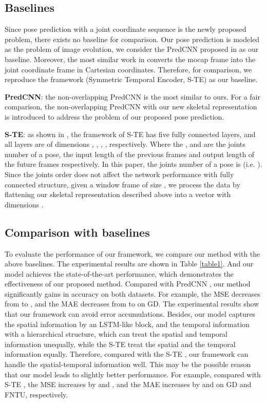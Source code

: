 \documentclass[journal]{IEEEtran}
\begin{document}
\subsection{Baselines}
Since pose prediction with a joint coordinate sequence is the newly proposed problem, there exists no baseline for comparison. Our pose prediction is modeled as the problem of image evolution, we consider the PredCNN proposed in \cite{predcnn} as our baseline. Moreover, the most similar work in \cite{ButepageDRL} converts the mocap frame into the joint coordinate frame in Cartesian coordinates. Therefore, for comparison, we reproduce the framework (Symmetric Temporal Encoder, S-TE) as our baseline.

{\bf PredCNN}: the non-overlapping PredCNN is the most similar to ours. For a fair comparison, the non-overlapping PredCNN with our new skeletal representation is introduced to address the problem of our proposed pose prediction.

{\bf S-TE}: as shown in \cite{ButepageDRL}, the framework of S-TE has five fully connected layers, and all layers are of dimensions  , , , ,  respectively. Where the ,  and  are the joints number of a pose, the input length of the previous frames and output length of the future frames respectively. In this paper, the joints number of a pose is  (i.e. ). Since the joints order does not affect the network performance with fully connected structure, given a window frame of size , we process the data by flattening our skeletal representation described above into a vector with dimensions .

\subsection{Comparison with baselines}
To evaluate the performance of our framework, we compare our method with the above baselines. The experimental results are shown in Table \ref{table1}. And our model achieves the state-of-the-art performance, which demonstrates the effectiveness of our proposed method. Compared with PredCNN \cite{predcnn}, our method significantly gains in accuracy on both datasets. For example, the MSE decreases from  to , and the MAE decreases from  to  on GD. The experimental results show that our framework can avoid error accumulations. Besides, our model captures the spatial information by an LSTM-like block, and the temporal information with a hierarchical structure, which can treat the spatial and temporal information unequally, while the S-TE \cite{ButepageDRL} treat the spatial and the temporal information equally. Therefore, compared with the S-TE \cite{ButepageDRL}, our framework can handle the spatial-temporal information well. This may be the possible reason that our model leads to slightly better performance. For example, compared with S-TE \cite{ButepageDRL}, the MSE increases by  and , and the MAE increases by  and  on GD and FNTU, respectively.
\end{document}
